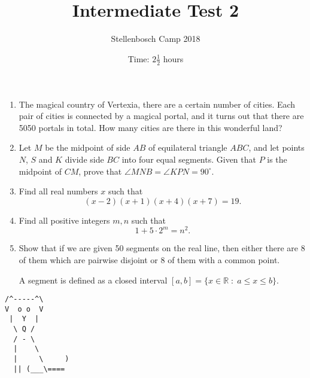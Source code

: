 \documentclass{article}
\title{Intermediate Test 2}
\author{Stellenbosch Camp 2018}
\date{Time: $2\frac{1}{2}$ hours}
\begin{document}
\maketitle

\begin{enumerate}[1.]

\item %
The magical country of Vertexia, there are a certain number of cities. Each pair of cities is connected by a magical portal, and it turns out that there are 5050 portals in total. How many cities are there in this wonderful land?

\vspace{12pt}
\item 
Let $M$ be the midpoint of side $AB$ of equilateral triangle $ABC$, and let points $N$, $S$ and $K$ divide side $BC$ into four equal segments. Given that $P$ is the midpoint of $CM$, prove that $\angle MNB = \angle KPN = 90^\circ$.

\vspace{12pt}
\item %
Find all real numbers $x$ such that \[ (x-2)(x+1)(x+4)(x+7) = 19. \]

\vspace{12pt}
\item %
Find all positive integers $m, n$ such that \[ 1 + 5 \cdot 2^m = n^2. \]

\vspace{12pt}
\item %
Show that if we are given 50 segments on the real line, then either there are 8 of them which are pairwise disjoint or 8 of them with a common point. 

A segment is defined as a closed interval $[a, b] = \{x \in \mathbb{R} \;:\; a \leq x \leq b \}$.

\end{enumerate}


\vspace{12pt}
\begin{center}
\begin{BVerbatim}
/^-----^\
V  o o  V
 |  Y  |
  \ Q /
  / - \
  |    \
  |     \     )
  || (___\====
\end{BVerbatim}
\end{center}
\end{document}
